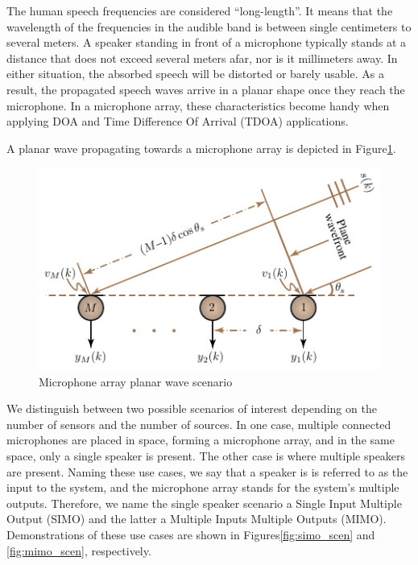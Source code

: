 The human speech frequencies are considered ``long-length''. 
It means that the wavelength of the 
frequencies in the audible band is 
between single centimeters to several meters. 
A speaker standing in front of a microphone typically stands 
at a distance that does not exceed several meters afar, nor is it 
millimeters away. In either situation, the absorbed speech
will be distorted or barely usable. As a result, the propagated speech
waves arrive in a planar shape once they reach the microphone.
In a microphone array, these characteristics become handy when applying DOA and 
Time Difference Of Arrival (TDOA) applications.

A planar wave propagating towards a microphone array 
is depicted in Figure\;\ref{fig:mic_arr_plan}.

\begin{figure}[H]
    \centering
    \includegraphics[width=\linewidth]{Beamformers/images/mic_array.png}
    \caption{Microphone array planar wave scenario}\label{fig:mic_arr_plan}
\end{figure}

We distinguish between two possible scenarios 
of interest depending on the number 
of sensors and the number of sources.
In one case, multiple connected microphones 
are placed in space, forming a microphone array, 
and in the same space, only a single speaker is present.
The other case is where multiple speakers are present. 
Naming these use cases, we say that a speaker is 
is referred to as the input to the system, and the microphone array
stands for the system's multiple outputs.
Therefore, we name the single speaker 
scenario a Single Input Multiple Output (SIMO) and the latter 
a Multiple Inputs Multiple Outputs (MIMO).
Demonstrations of these use cases are shown in 
Figures\;\ref{fig:simo_scen} and
\ref{fig:mimo_scen}, respectively.


